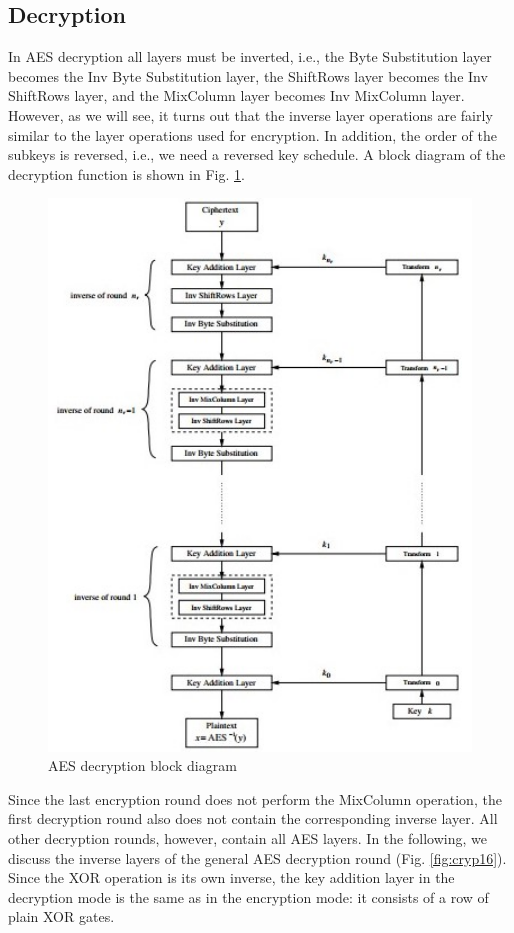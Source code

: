 \documentclass[../main.tex]{subfiles}
\begin{document}
\subsection{Decryption}
In AES decryption all layers must be inverted, i.e., the Byte Substitution layer becomes the Inv Byte Substitution layer,
the ShiftRows layer becomes the Inv ShiftRows layer, and the MixColumn layer
becomes Inv MixColumn layer. However, as we will see, it turns out that the inverse
layer operations are fairly similar to the layer operations used for encryption. In addition, the order of the subkeys is reversed, i.e., we need a reversed key schedule. A
block diagram of the decryption function is shown in Fig. \ref{fig:cryp15}.
\begin{figure}[h]
\centering
\includegraphics[width=12cm]{diagrams/cryp15.jpg}

\caption{AES decryption block diagram}
\label{fig:cryp15}
\end{figure}

Since the last encryption round does not perform the MixColumn operation, the
first decryption round also does not contain the corresponding inverse layer. All
other decryption rounds, however, contain all AES layers. In the following, we discuss the inverse layers of the general AES decryption round (Fig. \ref{fig:cryp16}). Since the XOR operation is its own inverse, the key addition layer in the decryption mode is
the same as in the encryption mode: it consists of a row of plain XOR gates.
\end{document}
